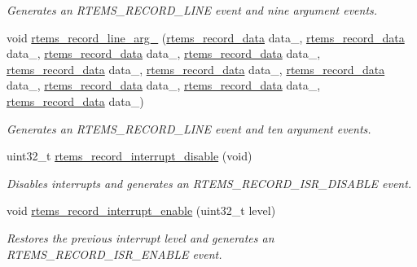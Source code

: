 \begin{DoxyCompactItemize}
\begin{DoxyCompactList}\small\item\em Generates an R\+T\+E\+M\+S\+\_\+\+R\+E\+C\+O\+R\+D\+\_\+\+L\+I\+NE event and nine argument events. \end{DoxyCompactList}\item 
void \mbox{\hyperlink{group__RTEMSRecord_ga29c660908f2516727be5446bf0bd5bf7}{rtems\+\_\+record\+\_\+line\+\_\+arg\+\_}} (\mbox{\hyperlink{group__RTEMSRecord_gab483bd3ec735835dac6788b78c817eab}{rtems\+\_\+record\+\_\+data}} data\+\_, \mbox{\hyperlink{group__RTEMSRecord_gab483bd3ec735835dac6788b78c817eab}{rtems\+\_\+record\+\_\+data}} data\+\_, \mbox{\hyperlink{group__RTEMSRecord_gab483bd3ec735835dac6788b78c817eab}{rtems\+\_\+record\+\_\+data}} data\+\_, \mbox{\hyperlink{group__RTEMSRecord_gab483bd3ec735835dac6788b78c817eab}{rtems\+\_\+record\+\_\+data}} data\+\_, \mbox{\hyperlink{group__RTEMSRecord_gab483bd3ec735835dac6788b78c817eab}{rtems\+\_\+record\+\_\+data}} data\+\_, \mbox{\hyperlink{group__RTEMSRecord_gab483bd3ec735835dac6788b78c817eab}{rtems\+\_\+record\+\_\+data}} data\+\_, \mbox{\hyperlink{group__RTEMSRecord_gab483bd3ec735835dac6788b78c817eab}{rtems\+\_\+record\+\_\+data}} data\+\_, \mbox{\hyperlink{group__RTEMSRecord_gab483bd3ec735835dac6788b78c817eab}{rtems\+\_\+record\+\_\+data}} data\+\_, \mbox{\hyperlink{group__RTEMSRecord_gab483bd3ec735835dac6788b78c817eab}{rtems\+\_\+record\+\_\+data}} data\+\_, \mbox{\hyperlink{group__RTEMSRecord_gab483bd3ec735835dac6788b78c817eab}{rtems\+\_\+record\+\_\+data}} data\+\_)
\begin{DoxyCompactList}\small\item\em Generates an R\+T\+E\+M\+S\+\_\+\+R\+E\+C\+O\+R\+D\+\_\+\+L\+I\+NE event and ten argument events. \end{DoxyCompactList}\item 
uint32\+\_\+t \mbox{\hyperlink{group__RTEMSRecord_ga95ef28ece3f724dd3c87055ad8b59176}{rtems\+\_\+record\+\_\+interrupt\+\_\+disable}} (void)
\begin{DoxyCompactList}\small\item\em Disables interrupts and generates an R\+T\+E\+M\+S\+\_\+\+R\+E\+C\+O\+R\+D\+\_\+\+I\+S\+R\+\_\+\+D\+I\+S\+A\+B\+LE event. \end{DoxyCompactList}\item 
void \mbox{\hyperlink{group__RTEMSRecord_gae2fc92f22a6875c0c95dd031ac26106b}{rtems\+\_\+record\+\_\+interrupt\+\_\+enable}} (uint32\+\_\+t level)
\begin{DoxyCompactList}\small\item\em Restores the previous interrupt level and generates an R\+T\+E\+M\+S\+\_\+\+R\+E\+C\+O\+R\+D\+\_\+\+I\+S\+R\+\_\+\+E\+N\+A\+B\+LE event. \end{DoxyCompactList}\item 

\end{DoxyCompactItemize}
